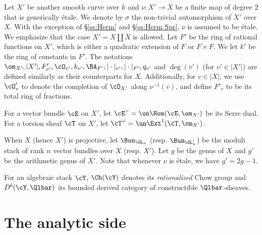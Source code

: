Let $X'$ be another smooth curve over $k$ and $\nu:X'\to X$ be a finite map of degree $2$ that is generically \'etale. We denote by $\sigma$ the non-trivial automorphism of $X'$ over $X$. With the exception of \S\ref{ss:Herm} and \S\ref{ss:Herm Spr}, $\nu$ is assumed to be \'etale. We emphasize that the case $X'=X\coprod X$ is allowed.  Let $F'$ be the ring of rational functions on $X'$, which is either a quadratic extension of $F$ or $F\times F$. We let $k'$ be the ring of constants in $F'$. The notations $\om_{X'}, |X'|, F'_{v'}, \cO_{v'}, k_{v'}, \BA_{F'}, |\cdot|_{v'}, |\cdot|_{F'}, q_{v'}$ and $\deg(v')$ (for $v'\in |X'|$) are defined similarly as their counterparts for $X$. Additionally, for $v\in |X|$, we use $\cO'_{v}$ to denote the completion of $\cO_{X'}$ along $\nu^{-1}(v)$, and define $F'_{v}$ to be its total ring of fractions.

For a vector bundle $\cE$ on $X'$, let $\cE^{\vee}=\un\Hom(\cE, \om_{X'})$ be its Serre dual.  For a torsion sheaf $\cT$ on $X'$, let $\cT^{\vee}=\un\Ext^{1}(\cT, \om_{X'})$.

When $X$ (hence $X'$) is projective, let $\Bun_{\GL_{n}}$ (resp. $\Bun_{\GL_{n}'}$) be the moduli stack of rank $n$ vector bundles over $X$ (resp. $X'$). Let $g$ be the genus of $X$ and $g'$ be the arithmetic genus of $X'$. Note that whenever $\nu$ is \'{e}tale, we have $g' = 2g-1$.


For an algebraic stack $\cY$, $\Ch(\cY)$ denotes its \emph{rationalized} Chow group and $D^b(\cY,\Qlbar)$  its bounded derived category of constructible $\Qlbar$-sheaves.





%






\part{The analytic side}
